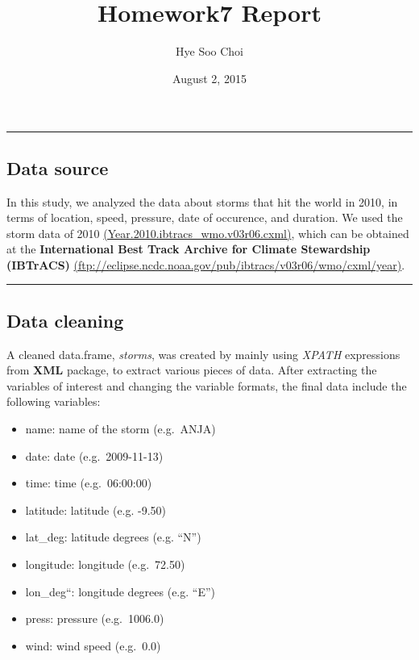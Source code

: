 \documentclass[]{article}
\title{Homework7 Report}
\author{Hye Soo Choi}
\date{August 2, 2015}
\begin{document}
\maketitle


\begin{center}\rule{0.5\linewidth}{\linethickness}\end{center}

\subsection{Data source}\label{data-source}

In this study, we analyzed the data about storms that hit the world in
2010, in terms of location, speed, pressure, date of occurence, and
duration. We used the storm data of 2010
\href{Year.2010.ibtracs_wmo.v03r06.cxml}{(Year.2010.ibtracs\_wmo.v03r06.cxml)},
which can be obtained at the \textbf{International Best Track Archive
for Climate Stewardship (IBTrACS)}
\href{ftp://eclipse.ncdc.noaa.gov/pub/ibtracs/v03r06/wmo/cxml/year}{(\url{ftp://eclipse.ncdc.noaa.gov/pub/ibtracs/v03r06/wmo/cxml/year})}.

\begin{center}\rule{0.5\linewidth}{\linethickness}\end{center}

\subsection{Data cleaning}\label{data-cleaning}

A cleaned data.frame, \emph{storms}, was created by mainly using
\emph{XPATH} expressions from \textbf{XML} package, to extract various
pieces of data. After extracting the variables of interest and changing
the variable formats, the final data include the following variables:

\begin{itemize}
\itemsep1pt\parskip0pt
\item
  name: name of the storm (e.g.~ANJA)
\item
  date: date (e.g.~2009-11-13)
\item
  time: time (e.g.~06:00:00)
\item
  latitude: latitude (e.g. -9.50)
\item
  lat\_deg: latitude degrees (e.g. ``N'')
\item
  longitude: longitude (e.g.~72.50)
\item
  lon\_deg``: longitude degrees (e.g. ``E'')
\item
  press: pressure (e.g.~1006.0)
\item
  wind: wind speed (e.g.~0.0)
\end{itemize}
\end{document}
